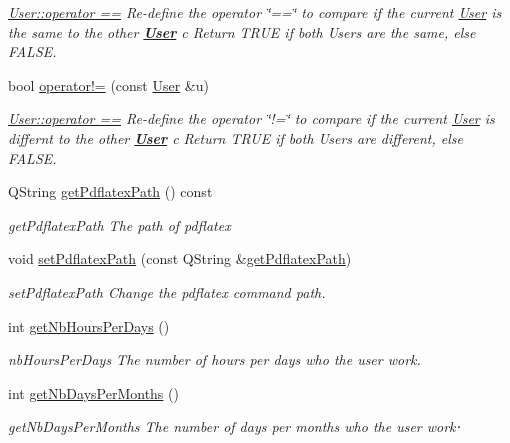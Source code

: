 \begin{DoxyCompactItemize}
\begin{DoxyCompactList}\small\item\em \hyperlink{classModels_1_1User_a60d18c2d1df053f1abf1215414f0b4b6}{User\+::operator ==} Re-\/define the operator \char`\"{}==\char`\"{} to compare if the current \hyperlink{classModels_1_1User}{User} is the same to the other {\bfseries \hyperlink{classModels_1_1User}{User}} {\itshape c} Return T\+R\+U\+E if both Users are the same, else F\+A\+L\+S\+E. \end{DoxyCompactList}\item 
bool \hyperlink{classModels_1_1User_aa1cdb1f752173aedd5f0c43edcb0b10b}{operator!=} (const \hyperlink{classModels_1_1User}{User} \&u)
\begin{DoxyCompactList}\small\item\em \hyperlink{classModels_1_1User_a60d18c2d1df053f1abf1215414f0b4b6}{User\+::operator ==} Re-\/define the operator \char`\"{}!=\char`\"{} to compare if the current \hyperlink{classModels_1_1User}{User} is differnt to the other {\bfseries \hyperlink{classModels_1_1User}{User}} {\itshape c} Return T\+R\+U\+E if both Users are different, else F\+A\+L\+S\+E. \end{DoxyCompactList}\item 
Q\+String \hyperlink{classModels_1_1User_ae8a894050c3e9266518707f6e5cd1c2f}{get\+Pdflatex\+Path} () const 
\begin{DoxyCompactList}\small\item\em get\+Pdflatex\+Path The path of pdflatex \end{DoxyCompactList}\item 
void \hyperlink{classModels_1_1User_ac65a44513c34f7e67888062d8bee3e54}{set\+Pdflatex\+Path} (const Q\+String \&\hyperlink{classModels_1_1User_ae8a894050c3e9266518707f6e5cd1c2f}{get\+Pdflatex\+Path})
\begin{DoxyCompactList}\small\item\em set\+Pdflatex\+Path Change the pdflatex command path. \end{DoxyCompactList}\item 
int \hyperlink{classModels_1_1User_acb46d721cae3c0a9059de32da0c33eaa}{get\+Nb\+Hours\+Per\+Days} ()
\begin{DoxyCompactList}\small\item\em nb\+Hours\+Per\+Days The number of hours per days who the user work. \end{DoxyCompactList}\item 
int \hyperlink{classModels_1_1User_a1ec672f16a5dbb248e05f2e957094c4d}{get\+Nb\+Days\+Per\+Months} ()
\begin{DoxyCompactList}\small\item\em get\+Nb\+Days\+Per\+Months The number of days per months who the user work⋅ \end{DoxyCompactList}\end{DoxyCompactItemize}
